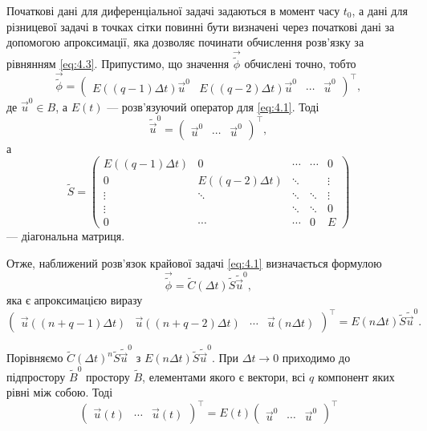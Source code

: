 Початкові дані для диференціальної задачі задаються в момент часу $t_0$, а дані для різницевої задачі в точках сітки повинні бути визначені через початкові дані за допомогою апроксимації, яка дозволяє починати обчислення розв'язку за рівнянням \eqref{eq:4.3}. Припустимо, що значення $\vec{\tilde{\phi}}$ обчислені точно, тобто 
\begin{equation}
    \vec{\tilde{\phi}} = \begin{pmatrix} E((q - 1)\Delta t) \vec u^0 & E((q - 2)\Delta t) \vec u^0 & \cdots & \vec u^0 \end{pmatrix}^\intercal,
\end{equation}
де $\vec u^0 \in B$, а $E(t)$ --- розв'язуючий оператор для \eqref{eq:4.1}. Тоді 
\begin{equation}
    \tilde{\vec{u}}^0 = \begin{pmatrix} \vec u^0 & \cdots & \vec u^0 \end{pmatrix}^\intercal,
\end{equation}
а
\begin{equation}
    \tilde S = \begin{pmatrix}
        E((q - 1) \Delta t) & 0 & \cdots & \cdots & 0 \\
        0 & E((q - 2) \Delta t) & \ddots & & \vdots \\
        \vdots & \ddots & \ddots & \ddots & \vdots \\
        \vdots & & \ddots & \ddots & 0 \\
        0 & \cdots & \cdots & 0 & E
    \end{pmatrix}
\end{equation}
---	діагональна матриця. \medskip

Отже, наближений розв'язок крайової задачі \eqref{eq:4.1} визначається формулою 
\begin{equation}
    \vec{\tilde{\phi}} = \tilde C(\Delta t) \tilde S \tilde{\vec{u}}^0,
\end{equation}
яка є апроксимацією виразу
\begin{equation}
    \begin{pmatrix} \vec u ((n + q - 1) \Delta t) & \vec u ((n + q - 2) \Delta t) & \cdots & \vec u (n \Delta t) \end{pmatrix}^\intercal = E (n \Delta t) \tilde S \tilde{\vec{u}}^0.
\end{equation}

Порівняємо $\tilde C(\Delta t)^n \tilde S \tilde{\vec{u}}^0$ з $E (n \Delta t) \tilde S \tilde{\vec{u}}^0$. При $\Delta t \to 0$ приходимо до підпростору $\tilde B^0$ простору $\tilde B$, елементами якого є вектори, всі $q$ компонент яких рівні між собою. Тоді
\begin{equation}
    \begin{pmatrix} \vec u(t) & \cdots & \vec u(t) \end{pmatrix}^\intercal = E(t) \begin{pmatrix} \vec u^0 & \cdots & \vec u^0 \end{pmatrix}^\intercal
\end{equation}

